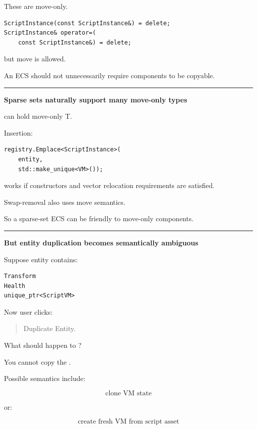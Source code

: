 These are move-only.

\begin{verbatim}
ScriptInstance(const ScriptInstance&) = delete;
ScriptInstance& operator=(
    const ScriptInstance&) = delete;
\end{verbatim}

but move is allowed.

An ECS should not unnecessarily require components to be copyable.

\begin{center}\rule{0.5\linewidth}{0.5pt}\end{center}

\textbf{Sparse sets naturally support many move-only types}

 can hold move-only T.

Insertion:

\begin{verbatim}
registry.Emplace<ScriptInstance>(
    entity,
    std::make_unique<VM>());
\end{verbatim}

works if constructors and vector relocation requirements are satisfied.

Swap-removal also uses move semantics.

So a sparse-set ECS can be friendly to move-only components.

\begin{center}\rule{0.5\linewidth}{0.5pt}\end{center}

\textbf{But entity duplication becomes semantically ambiguous}

Suppose entity contains:

\begin{verbatim}
Transform
Health
unique_ptr<ScriptVM>
\end{verbatim}

Now user clicks:

\begin{quote}
Duplicate Entity.
\end{quote}

What should happen to ?

You cannot copy the .

Possible semantics include:

\[
\text{clone VM state}
\]

or:

\[
\text{create fresh VM from script asset}
\]

